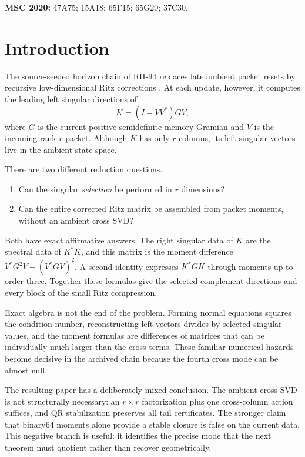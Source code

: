 \documentclass[11pt]{article}
\theoremstyle{definition}
\theoremstyle{remark}
\begin{document}
\medskip
\noindent\textbf{MSC 2020:} 47A75; 15A18; 65F15; 65G20; 37C30.

\section{Introduction}

The source-seeded horizon chain of RH-94 replaces late ambient packet resets
by recursive low-dimensional Ritz corrections
\citep{WangSourceSeed2026}.  At each update, however, it computes the leading
left singular directions of
\[
 K=(I-VV^*)GV,
\]
where $G$ is the current positive semidefinite memory Gramian and $V$ is the
incoming rank-$r$ packet.  Although $K$ has only $r$ columns, its left
singular vectors live in the ambient state space.

There are two different reduction questions.
\begin{enumerate}[leftmargin=2em]
\item Can the singular \emph{selection} be performed in $r$ dimensions?
\item Can the entire corrected Ritz matrix be assembled from packet moments,
without an ambient cross SVD?
\end{enumerate}
Both have exact affirmative answers.  The right singular data of $K$ are the
spectral data of $K^*K$, and this matrix is the moment difference
$V^*G^2V-(V^*GV)^2$.  A second identity expresses $K^*GK$ through moments up
to order three.  Together these formulas give the selected complement
directions and every block of the small Ritz compression.

Exact algebra is not the end of the problem.  Forming normal equations squares
the condition number, reconstructing left vectors divides by selected
singular values, and the moment formulas are differences of matrices that can
be individually much larger than the cross terms.  These familiar numerical
hazards \citep{Higham2002,GolubVanLoan2013} become decisive in the archived
chain because the fourth cross mode can be almost null.

The resulting paper has a deliberately mixed conclusion.  The ambient cross
SVD is not structurally necessary: an $r\times r$ factorization plus one
cross-column action suffices, and QR stabilization preserves all tail
certificates.  The stronger claim that binary64 moments alone provide a
stable closure is false on the current data.  This negative branch is useful:
it identifies the precise mode that the next theorem must quotient rather
than recover geometrically.
\end{document}
